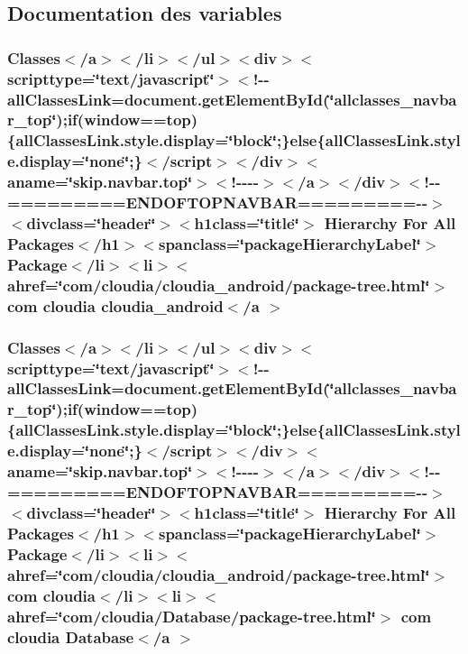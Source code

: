 \subsection{Documentation des variables}
\hypertarget{overview-tree_8html_a23f2c691db59175f646767a6ce091103}{
\subsubsection[{cloudia\-\_\-android$<$/a $>$}]{\setlength{\rightskip}{0pt plus 5cm}Classes$<$/{\bf a}$>$$<$/li$>$$<$/ul$>$$<$div$>$$<$scripttype=\char`\"{}text/javascript\char`\"{}$>$$<$!-\/-\/all\-Classes\-Link=document.\-get\-Element\-By\-Id(\char`\"{}allclasses\-\_\-navbar\-\_\-top\char`\"{});if(window==top)\{all\-Classes\-Link.\-style.\-display=\char`\"{}block\char`\"{};\}else\{all\-Classes\-Link.\-style.\-display=\char`\"{}none\char`\"{};\}$<$/script$>$$<$/div$>$$<$aname=\char`\"{}skip.\-navbar.\-top\char`\"{}$>$$<$!-\/-\/-\/-\/$>$$<$/a$>$$<$/div$>$$<$!-\/-\/=========E\-N\-D\-O\-F\-T\-O\-P\-N\-A\-V\-B\-A\-R=========-\/-\/$>$$<$divclass=\char`\"{}header\char`\"{}$>$$<$h1class=\char`\"{}title\char`\"{}$>$ Hierarchy For All Packages$<$/h1$>$$<$spanclass=\char`\"{}package\-Hierarchy\-Label\char`\"{}$>$ Package$<$/li$>$$<$li$>$$<$ahref=\char`\"{}com/cloudia/cloudia\-\_\-android/package-\/tree.\-html\char`\"{}$>$ com cloudia cloudia\-\_\-android$<$/{\bf a} $>$}}\label{overview-tree_8html_a23f2c691db59175f646767a6ce091103}
\hypertarget{overview-tree_8html_a3877c85b468efd80aba5bff279eb7556}{
\subsubsection[{Database$<$/a $>$}]{\setlength{\rightskip}{0pt plus 5cm}Classes$<$/{\bf a}$>$$<$/li$>$$<$/ul$>$$<$div$>$$<$scripttype=\char`\"{}text/javascript\char`\"{}$>$$<$!-\/-\/all\-Classes\-Link=document.\-get\-Element\-By\-Id(\char`\"{}allclasses\-\_\-navbar\-\_\-top\char`\"{});if(window==top)\{all\-Classes\-Link.\-style.\-display=\char`\"{}block\char`\"{};\}else\{all\-Classes\-Link.\-style.\-display=\char`\"{}none\char`\"{};\}$<$/script$>$$<$/div$>$$<$aname=\char`\"{}skip.\-navbar.\-top\char`\"{}$>$$<$!-\/-\/-\/-\/$>$$<$/a$>$$<$/div$>$$<$!-\/-\/=========E\-N\-D\-O\-F\-T\-O\-P\-N\-A\-V\-B\-A\-R=========-\/-\/$>$$<$divclass=\char`\"{}header\char`\"{}$>$$<$h1class=\char`\"{}title\char`\"{}$>$ Hierarchy For All Packages$<$/h1$>$$<$spanclass=\char`\"{}package\-Hierarchy\-Label\char`\"{}$>$ Package$<$/li$>$$<$li$>$$<$ahref=\char`\"{}com/cloudia/cloudia\-\_\-android/package-\/tree.\-html\char`\"{}$>$ com cloudia$<$/li$>$$<$li$>$$<$ahref=\char`\"{}com/cloudia/Database/package-\/tree.\-html\char`\"{}$>$ com cloudia Database$<$/{\bf a} $>$}}\label{overview-tree_8html_a3877c85b468efd80aba5bff279eb7556}
